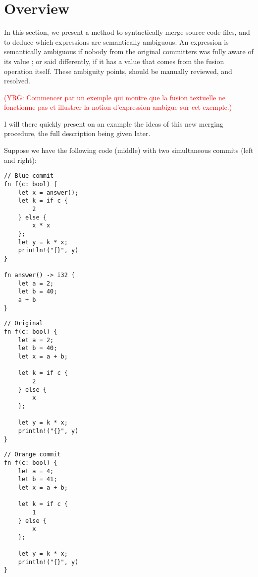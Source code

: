 \documentclass[a4paper,10pt]{article}
\newcommand\yrg[1]{\textcolor{red}{(YRG: #1)}}
\begin{document}
\section{Overview}
\label{sec:overview}

In this section, we present a method to syntactically merge source
code files, and to deduce which expressions are semantically
ambiguous. An expression is semantically ambiguous if nobody from the
original committers was fully aware of its value ; or said
differently, if it has a value that comes from the fusion operation
itself. These ambiguity points, should be manually reviewed, and
resolved.

\yrg{Commencer par un exemple qui montre que la fusion textuelle
ne fonctionne pas et illustrer la notion d'expression ambigue
sur cet exemple.}

I will there quickly present on an example the ideas of this new
merging procedure, the full description being given later.

Suppose we have the following code (middle) with two simultaneous
commits (left and right):

\noindent
\begin{minipage}{.32\textwidth}
\begin{lstlisting}[rulecolor=\color{blue!20}]
// Blue commit
fn f(c: bool) {
    let x = answer();
    let k = if c {
        2
    } else {
        x * x
    };
    let y = k * x;
    println!("{}", y)
}

fn answer() -> i32 {
    let a = 2;
    let b = 40;
    a + b
}
\end{lstlisting}
\end{minipage}\hfill
\begin{minipage}{.32\textwidth}
\begin{lstlisting}
// Original
fn f(c: bool) {
    let a = 2;
    let b = 40;
    let x = a + b;

    let k = if c {
        2
    } else {
        x
    };

    let y = k * x;
    println!("{}", y)
}
\end{lstlisting}
\end{minipage}\hfill
\begin{minipage}{.32\textwidth}
\begin{lstlisting}[rulecolor=\color{orange!30}]
// Orange commit
fn f(c: bool) {
    let a = 4;
    let b = 41;
    let x = a + b;

    let k = if c {
        1
    } else {
        x
    };

    let y = k * x;
    println!("{}", y)
}
\end{lstlisting}
\end{minipage}
\vspace{-.4cm}
\begin{lstlisting}[label=lst:overview_commits, caption={A source code and two concurrent commits on it}]
\end{lstlisting}
\end{document}
